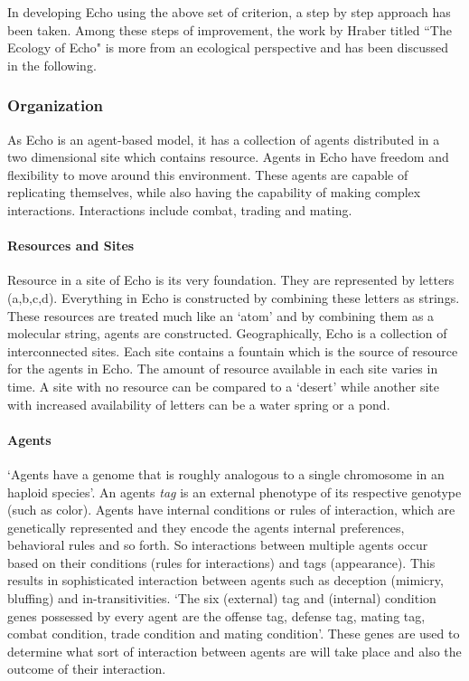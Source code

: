 In developing Echo using the above set of criterion, a step by step approach has been taken. Among these steps of improvement, the work by Hraber titled ``The Ecology of Echo" \cite{hraber1997} is more from an ecological perspective and has been discussed in the following.

\subsubsection{Organization}
As Echo is an agent-based model, it has a collection of agents distributed in a two dimensional site which contains resource. Agents in Echo have freedom and flexibility to move around this environment. These agents are capable of replicating themselves, while also having the capability of making complex interactions. Interactions include combat, trading and mating.

\paragraph{Resources and Sites}
Resource in a site of Echo is its very foundation. They are represented by letters (a,b,c,d). Everything in Echo is constructed by combining these letters as strings. These resources are treated much like an `atom' and by combining them as a molecular string, agents are constructed. Geographically, Echo is a collection of interconnected sites. Each site contains a fountain which is the source of resource for the agents in Echo. The amount of resource available in each site varies in time. A site with no resource can be compared to a `desert' while another site with increased availability of letters can be a water spring or a pond. 

\paragraph{Agents}
`Agents have a genome that is roughly analogous to a single chromosome in an haploid species'. An agents \textsl{tag} is an external phenotype of its respective genotype (such as color). Agents have internal conditions or rules of interaction, which are genetically represented and they encode the agents internal preferences, behavioral rules and so forth. So interactions between multiple agents occur based on their conditions (rules for interactions) and tags (appearance). This results in sophisticated interaction between agents such as deception (mimicry, bluffing) and in-transitivities. `The six (external) tag and (internal) condition genes possessed by every agent are the offense tag, defense tag, mating tag, combat condition, trade condition and mating condition'. These genes are used to determine what sort of interaction between agents are will take place and also the outcome of their interaction. 


